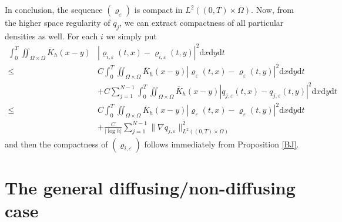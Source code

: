 \documentclass[11pt]{article}
\newcommand{\dd}{\mathrm{d}}
\numberwithin{equation}{section}
\numberwithin{tw}{section}
\begin{document}
In conclusion, the sequence $(\varrho_\varepsilon)$ is compact in $L^2((0,T)\times\Omega)$. Now, from the higher space regularity of $q_j$, we can extract compactness of all particular densities as well. For each $i$ we simply put 
\[\begin{aligned} \int_0^T\iint_{\Omega\times\Omega} \overline{K}_h(x-y) & |\varrho_{i,\varepsilon}(t,x)-\varrho_{i,\varepsilon}(t,y)|^2\dd x\dd y\dd t \\
\leq & C\int_0^T\iint_{\Omega\times\Omega}\overline{K}_h(x-y) |\varrho_\varepsilon(t,x)-\varrho_\varepsilon(t,y)|^2\dd x\dd y\dd t \\
&+ C\sum_{j=1}^{N-1}\int_0^T\iint_{\Omega\times\Omega}\overline{K}_h(x-y)|q_{j,\varepsilon}(t,x)-q_{j,\varepsilon}(t,y)|^2\dd x\dd y\dd t \\
\leq & C\int_0^T\iint_{\Omega\times\Omega} \overline{K}_h(x-y)|\varrho_\varepsilon(t,x)-\varrho_\varepsilon(t,y)|^2\dd x\dd y\dd t \\
&+ \frac{C}{|\log h|}\sum_{j=1}^{N-1}\|\nabla q_{j,\varepsilon}\|_{L^2((0,T)\times\Omega)}^2
\end{aligned}\]
and then the compactness of $(\varrho_{i,\varepsilon})$ follows immediately from Proposition \ref{BJ}.


\section{The general diffusing/non-diffusing case}
\end{document}
